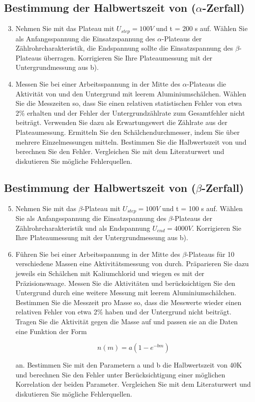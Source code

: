 \subsection{Bestimmung der Halbwertszeit von  ($\alpha$-Zerfall)}
\begin{enumerate}
\setcounter{enumi}{2}
\item Nehmen Sie mit  das Plateau mit $U_{step} = 100 V$ und t = 200 s auf. Wählen Sie als Anfangsspannung die Einsatzspannung des $\alpha$-Plateaus der Zählrohrcharakteristik, die Endspannung sollte die Einsatzspannung des $\beta$-Plateaus überragen. Korrigieren Sie Ihre Plateaumessung mit der Untergrundmessung aus b).

\item Messen Sie bei einer Arbeitsspannung in der Mitte des $\alpha$-Plateaus die Aktivität von  und den Untergrund mit leerem Aluminiumschälchen. Wählen Sie die Messzeiten so, dass Sie einen relativen statistischen Fehler von etwa 2\% erhalten und der Fehler der Untergrundzählrate zum Gesamtfehler nicht beiträgt. Verwenden Sie dazu als Erwartungswert die Zählrate aus der Plateaumessung. Ermitteln Sie den Schälchendurchmesser, indem Sie über mehrere Einzelmessungen mitteln.
Bestimmen Sie die Halbwertszeit von  und berechnen Sie den Fehler.
Vergleichen Sie mit dem Literaturwert und diskutieren Sie mögliche Fehlerquellen.
\end{enumerate}

\subsection{Bestimmung der Halbwertszeit von  ($\beta$-Zerfall)}
\begin{enumerate}
\setcounter{enumi}{4}
\item Nehmen Sie mit  das $\beta$-Plateau mit $U_{step} = 100 V$ und t = 100 s auf. Wählen Sie als Anfangsspannung die Einsatzspannung des $\beta$-Plateaus der Zählrohrcharakteristik und als Endspannung $U_{end} = 4000 V$. Korrigieren Sie Ihre Plateaumessung mit der
Untergrundmessung aus b).
\item Führen Sie bei einer Arbeitsspannung in der Mitte des $\beta$-Plateaus für 10 verschiedene Massen eine Aktivitätsmessung von  durch. Präparieren Sie dazu jeweils ein Schälchen mit Kaliumchlorid und wiegen es mit der Präzisionswaage.
Messen Sie die Aktivitäten und berücksichtigen Sie den Untergrund durch eine weitere Messung mit leerem Aluminiumschälchen. Bestimmen Sie die Messzeit pro Masse so, dass die Messwerte wieder einen relativen Fehler von etwa 2\% haben und der Untergrund nicht beiträgt. Tragen Sie die Aktivität gegen die Masse auf und passen sie an die Daten eine Funktion der Form

$$ n\left( m \right) = a \left( 1 - e^{-bm} \right)$$

an. Bestimmen Sie mit den Parametern a und b die Halbwertszeit von 40K und berechnen Sie den Fehler unter Berücksichtigung einer möglichen Korrelation der beiden Parameter. Vergleichen Sie mit dem Literaturwert und diskutieren Sie mögliche Fehlerquellen.


\end{enumerate}

